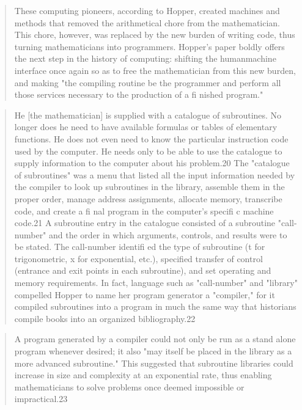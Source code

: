 \begin{quotation}
These computing pioneers, according to
Hopper, created machines and methods that removed the arithmetical chore from the mathematician. This chore, however, was
replaced by the new burden of writing code, thus turning mathematicians into programmers. Hopper's paper boldly offers the
next step in the history of computing: shifting the humanmachine interface once again so as to free the mathematician
from this new burden, and making "the compiling routine be
the programmer and perform all those services necessary to the
production of a fi nished program."
\end{quotation}

\begin{quotation}
He [the mathematician] is supplied with a catalogue of subroutines. No
longer does he need to have available formulas or tables of elementary
functions. He does not even need to know the particular instruction
code used by the computer. He needs only to be able to use the catalogue to supply information to the computer about his problem.20
The "catalogue of subroutines" was a menu that listed all the
input information needed by the compiler to look up subroutines in the library, assemble them in the proper order, manage
address assignments, allocate memory, transcribe code, and create
a fi nal program in the computer's specifi c machine code.21 A
subroutine entry in the catalogue consisted of a subroutine
"call-number" and the order in which arguments, controls, and
results were to be stated. The call-number identifi ed the type of
subroutine (t for trigonometric, x for exponential, etc.), specified
transfer of control (entrance and exit points in each subroutine),
and set operating and memory requirements. In fact, language
such as "call-number" and "library" compelled Hopper to name
her program generator a "compiler," for it compiled subroutines
into a program in much the same way that historians compile
books into an organized bibliography.22
\end{quotation}

\begin{quotation}
A program generated by a compiler could not only be
run as a stand alone program whenever desired; it also "may itself
be placed in the library as a more advanced subroutine." This
suggested that subroutine libraries could increase in size and
complexity at an exponential rate, thus enabling mathematicians
to solve problems once deemed impossible or impractical.23
\end{quotation}

